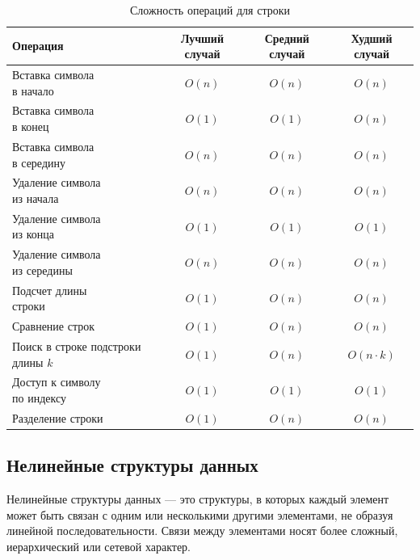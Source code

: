 \documentclass[a4paper,12pt]{article}
\begin{document}
\begin{table}[H]
    \centering
    \begin{tabular}{|l|c|c|c|}
        \hline
        Операция & Лучший случай & Средний случай & Худший случай \\
        \hline
        \makecell[l]{Вставка символа \\в начало} & $O(n)$ & $O(n)$ & $O(n)$ \\
        \hline
        \makecell[l]{Вставка символа \\в конец} & $O(1)$ & $O(1)$ & $O(n)$ \\
        \hline
        \makecell[l]{Вставка символа \\в середину} & $O(n)$ & $O(n)$ & $O(n)$ \\
        \hline
        \makecell[l]{Удаление символа \\из начала} & $O(n)$ & $O(n)$ & $O(n)$ \\
        \hline
        \makecell[l]{Удаление символа \\из конца} & $O(1)$ & $O(1)$ & $O(1)$ \\
        \hline
        \makecell[l]{Удаление символа \\из середины} & $O(n)$ & $O(n)$ & $O(n)$ \\
        \hline
        \makecell[l]{Подсчет длины \\строки} & $O(1)$ & $O(n)$ & $O(n)$ \\
        \hline
        Сравнение строк & $O(1)$ & $O(n)$ & $O(n)$ \\
        \hline
        \makecell[l]{Поиск в строке \\подстроки длины $k$} & $O(1)$ & $O(n)$ & $O(n \cdot k)$ \\
        \hline
        \makecell[l]{Доступ к символу \\по индексу} & $O(1)$ & $O(1)$ & $O(1)$ \\
        \hline
        Разделение строки & $O(1)$ & $O(n)$ & $O(n)$ \\
        \hline
    \end{tabular}
    \caption{Сложность операций для строки}
\end{table}

\subsection{Нелинейные структуры данных}
\label{subsec:нелинейные-структуры-данных}

Нелинейные структуры данных --- это структуры, в которых каждый элемент может быть связан с одним или несколькими другими элементами, не образуя линейной последовательности. Связи между элементами носят более сложный, иерархический или сетевой характер.
\end{document}

